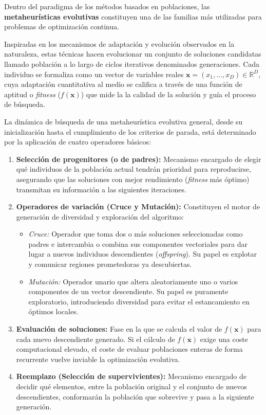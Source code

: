 Dentro del paradigma de los métodos basados en poblaciones, las
\textbf{metaheurísticas evolutivas} constituyen una de las familias más
utilizadas para problemas de optimización continua.

Inspiradas en los mecanismos de adaptación y evolución observados en la naturaleza, estas técnicas hacen evolucionar un conjunto de soluciones candidatas llamado población a lo largo de ciclos iterativos denominados generaciones. Cada individuo se formaliza como un vector de variables reales $\mathbf{x} = (x_1, \dots, x_D) \in \mathbb{R}^D$, cuya adaptación cuantitativa al medio se califica a través de una función de aptitud o \textit{fitness} ($f(\mathbf{x})$) que mide la la calidad de la solución y guía el proceso de búsqueda.

La dinámica de búsqueda de una metaheurística evolutiva general, desde su inicialización hasta el cumplimiento de los criterios de parada, está determinado por la aplicación de cuatro operadores básicos:

\begin{enumerate}
    \item \textbf{Selección de progenitores (o de padres):} Mecanismo encargado de elegir qué individuos de la población actual tendrán prioridad para reproducirse, asegurando que las soluciones con mejor rendimiento (\textit{fitness} más óptimo) transmitan su información a las siguientes iteraciones.
    \item \textbf{Operadores de variación (Cruce y Mutación):} Constituyen el motor de generación de diversidad y exploración del algoritmo:
          \begin{itemize}
              \item \textit{Cruce:} Operador que toma dos o más soluciones seleccionadas como padres e intercambia o combina sus componentes vectoriales para dar lugar a nuevos individuos descendientes (\textit{offspring}). Su papel es explotar y comunicar regiones prometedoras ya descubiertas.
              \item \textit{Mutación:} Operador unario que altera aleatoriamente uno o varios componentes de un vector descendiente. Su papel es puramente exploratorio, introduciendo diversidad para evitar el estancamiento en óptimos locales.
          \end{itemize}
    \item \textbf{Evaluación de soluciones:} Fase en la que se calcula el valor de $f(\mathbf{x})$ para cada nuevo descendiente generado. Si el cálculo de $f(\mathbf{x})$ exige una coste computacional elevado, el coste de evaluar poblaciones enteras de forma recurrente vuelve inviable la optimización evolutiva.
    \item \textbf{Reemplazo (Selección de supervivientes):} Mecanismo encargado de decidir qué elementos, entre la población original y el conjunto de nuevos descendientes, conformarán la población que sobrevive y pasa a la siguiente generación.
\end{enumerate}

